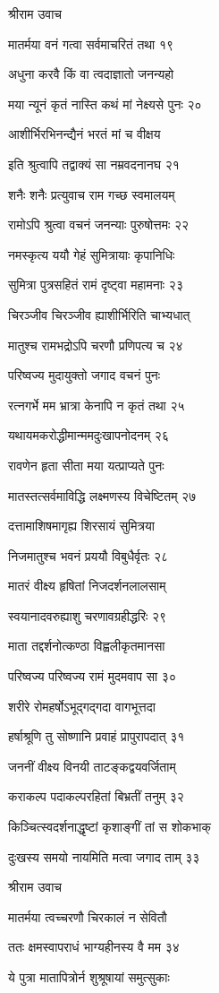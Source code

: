 श्रीराम उवाच

मातर्मया वनं गत्वा सर्वमाचरितं तथा १९

अधुना करवै किं वा त्वदाज्ञातो जनन्यहो

मया न्यूनं कृतं नास्ति कथं मां नेक्ष्यसे पुनः २०

आशीर्भिरभिनन्द्यैनं भरतं मां च वीक्षय

इति श्रुत्वापि तद्वाक्यं सा नम्रवदनानघ २१

शनैः शनैः प्रत्युवाच राम गच्छ स्वमालयम्

रामोऽपि श्रुत्वा वचनं जनन्याः पुरुषोत्तमः २२

नमस्कृत्य ययौ गेहं सुमित्रायाः कृपानिधिः

सुमित्रा पुत्रसहितं रामं दृष्ट्वा महामनाः २३

चिरञ्जीव चिरञ्जीव ह्याशीर्भिरिति चाभ्यधात्

मातुश्च रामभद्रोऽपि चरणौ प्रणिपत्य च २४

परिष्वज्य मुदायुक्तो जगाद वचनं पुनः

रत्नगर्भे मम भ्रात्रा केनापि न कृतं तथा २५

यथायमकरोद्धीमान्ममदुःखापनोदनम् २६

रावणेन हृता सीता मया यत्प्राप्यते पुनः

मातस्तत्सर्वमाविद्धि लक्ष्मणस्य विचेष्टितम् २७

दत्तामाशिषमागृह्य शिरसायं सुमित्रया

निजमातुश्च भवनं प्रययौ विबुधैर्वृतः २८

मातरं वीक्ष्य हृषितां निजदर्शनलालसाम्

स्वयानादवरुह्याशु चरणावग्रहीद्धरिः २९

माता तद्दर्शनोत्कण्ठा विह्वलीकृतमानसा

परिष्वज्य परिष्वज्य रामं मुदमवाप सा ३०

शरीरे रोमहर्षोऽभूद्गद्गदा वागभूत्तदा

हर्षाश्रूणि तु सोष्णानि प्रवाहं प्रापुरापदात् ३१

जननीं वीक्ष्य विनयी ताटङ्कद्वयवर्जिताम्

कराकल्प पदाकल्परहितां बिभ्रतीं तनुम् ३२

किञ्चित्स्वदर्शनाद्धृष्टां कृशाङ्गीं तां स शोकभाक्

दुःखस्य समयो नायमिति मत्वा जगाद ताम् ३३

श्रीराम उवाच

मातर्मया त्वच्चरणौ चिरकालं न सेवितौ

ततः क्षमस्वापराधं भाग्यहीनस्य वै मम ३४

ये पुत्रा मातापित्रोर्न शुश्रूषायां समुत्सुकाः

